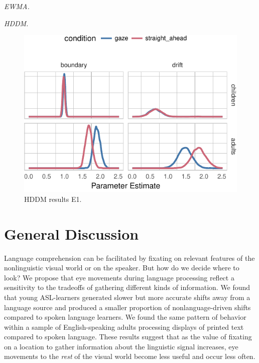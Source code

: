 \documentclass[10pt, letterpaper]{article}
\newenvironment{CodeChunk}{}{}
\begin{document}
\emph{EWMA.}

\emph{HDDM.}

\begin{CodeChunk}
\begin{figure}[t]

{\centering \includegraphics[width=0.85\linewidth]{figs/hddm_plot_gaze-1} 

}

\caption[HDDM results E1]{HDDM results E1.}\label{fig:hddm_plot_gaze}
\end{figure}
\end{CodeChunk}

\section{General Discussion}\label{general-discussion}

Language comprehension can be facilitated by fixating on relevant
features of the nonlinguistic visual world or on the speaker. But how do
we decide where to look? We propose that eye movements during language
processing reflect a sensitivity to the tradeoffs of gathering different
kinds of information. We found that young ASL-learners generated slower
but more accurate shifts away from a language source and produced a
smaller proportion of nonlanguage-driven shifts compared to spoken
language learners. We found the same pattern of behavior within a sample
of English-speaking adults processing displays of printed text compared
to spoken language. These results suggest that as the value of fixating
on a location to gather information about the linguistic signal
increases, eye movements to the \emph{rest} of the visual world become
less useful and occur less often.
\end{document}
